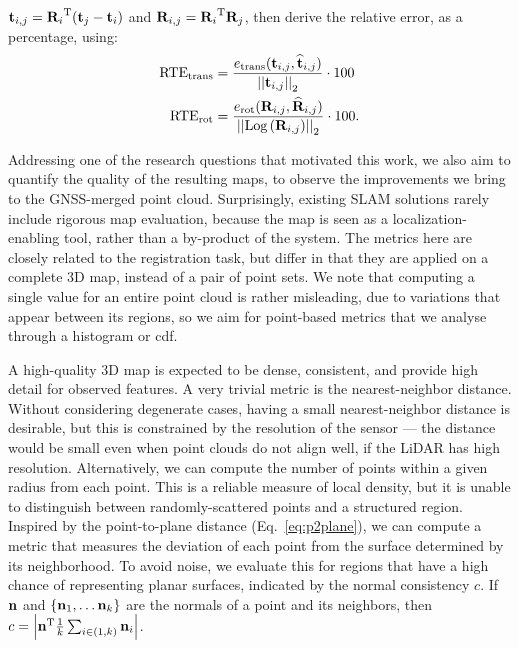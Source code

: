 $\mathbf{t}_{i,j} = {\mathbf{R}_i}^\text{T}(\mathbf{t}_j - \mathbf{t}_i)$
and
$\mathbf{R}_{i,j} = {\mathbf{R}_i}^\text{T}\mathbf{R}_j$,
then derive the relative error, as a percentage, using:
\begin{equation}
    \begin{aligned}
        \text{RTE}_{\text{trans}} & =
        \frac{e_{\text{trans}}(\mathbf{t}_{i,j}, \widehat{\mathbf{t}}_{i,j})}{\left|\left|{\mathbf{t}_{i,j}}\right|\right|_2} \cdot 100                  \\
        \text{RTE}_{\text{rot}}   & =\frac{
            e_{\text{rot}}(\mathbf{R}_{i,j}, \widehat{\mathbf{R}}_{i,j} ) }{\left|\left|{\text{Log}\left({\mathbf{R}_{i,j}}\right)}\right|\right|_2} \cdot 100    \text{.} \\
    \end{aligned}
\end{equation}

Addressing one of the research questions that motivated this work, we also aim to quantify the quality of the resulting maps, to observe the improvements we bring to the GNSS-merged point cloud. Surprisingly, existing SLAM solutions rarely include rigorous map evaluation, because the map is seen as a localization-enabling tool, rather than a by-product of the system.
The metrics here are closely related to the registration task, but differ in that they are applied on a complete 3D map, instead of a pair of point sets. We note that computing a single value for an entire point cloud is rather misleading, due to variations that appear between its regions, so we aim for point-based metrics that we analyse through a histogram or \acrfull{cdf}.

A high-quality 3D map is expected to be dense, consistent, and provide high detail for observed features. A very trivial metric is the nearest-neighbor distance. Without considering degenerate cases, having a small nearest-neighbor distance is desirable, but this is constrained by the resolution of the sensor --- the distance would be small even when point clouds do not align well, if the LiDAR has high resolution.
Alternatively, we can compute the number of points within a given radius from each point. This is a reliable measure of local density, but it is unable to distinguish between randomly-scattered points and a structured region.
Inspired by the point-to-plane distance (Eq.~\ref{eq:p2plane}), we can compute a metric that measures the deviation of each point from the surface determined by its neighborhood. To avoid noise, we evaluate this for regions that have a high chance of representing planar surfaces, indicated by the normal consistency $c$.
If $\mathbf{n}$ and \mbox{$\left\{\mathbf{n}_1, \dots \mathbf{n}_k\right\}$} are the normals of a point and its neighbors, then
\mbox{$c = \left|{{\mathbf{n}}^\text{T} \frac{1}{k}\sum_{i \in (1, k)} \mathbf{n}_i}\right|$}.

